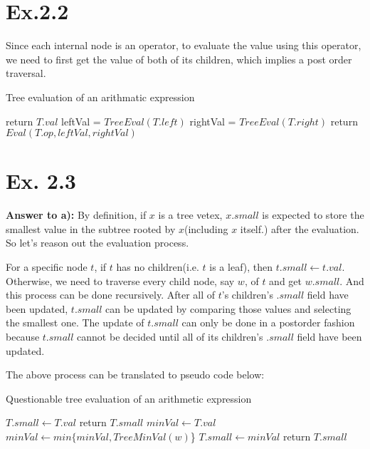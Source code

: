 \documentclass[a4paper,11pt]{article}
\theoremstyle{mytheor}
\begin{document}
\vspace{1.2in}

\section*{Ex.2.2}
Since each internal node is an operator, to evaluate the value using this operator, we need to first get the value of both of its children, which implies a post order traversal.

\begin{algorithm}[H]
\caption{Tree evaluation of an arithmatic expression}\label{TREEEVALUATION_2_2}
\begin{algorithmic}[1]
    \State return $T.val$
  \EndIf
  \State leftVal = $TreeEval(T.left)$
  \State rightVal = $TreeEval(T.right)$
  \State return $Eval(T.op, leftVal, rightVal)$
\EndFunction
\end{algorithmic}
\end{algorithm}

\vspace{1.2in}

\section*{Ex. 2.3}
\noindent\textbf{Answer to a):} By definition, if $x$ is a tree vetex, $x.small$ is expected to store the smallest value in the subtree rooted by $x$(including $x$ itself.) after the evaluation. So let's reason out the evaluation process.

For a specific node $t$, if $t$ has no children(i.e. $t$ is a leaf), then $t.small \gets t.val$. Otherwise, we need to traverse every child node, say $w$, of $t$ and get $w.small$. And this process can be done recursively. After all of $t$'s children's $.small$ field have been updated, $t.small$ can be updated by comparing those values and selecting the smallest one. The update of $t.small$ can only be done in a postorder fashion because $t.small$ cannot be decided until all of its children's $.small$ field have been updated.

The above process can be translated to pseudo code below:

\begin{algorithm}[H]
\caption{Questionable tree evaluation of an arithmetic expression}\label{sec:TREEEVALUATION_2_3_1}
\begin{algorithmic}[1]
    \State $T.small \gets T.val$
    \State return $T.small$
  \Else
    \State $minVal \gets T.val$
      \State $minVal \gets min\{minVal, TreeMinVal(w)$\} 
    \EndFor
    \State $T.small \gets minVal$
    \State return $T.small$
  \EndIf
\EndFunction
\end{algorithmic}
\end{algorithm}
\end{document}
